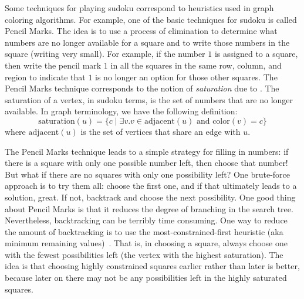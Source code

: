 \documentclass[7x10]{TimesAPriori_MIT}%
\numberwithin{theorem}{chapter}
\numberwithin{definition}{chapter}
\numberwithin{equation}{chapter}
\begin{document}
Some techniques for playing sudoku correspond to heuristics used in
graph coloring algorithms.  For example, one of the basic techniques
for sudoku is called Pencil Marks. The idea is to use a process of
elimination to determine what numbers are no longer available for a
square and to write those numbers in the square (writing very
small). For example, if the number $1$ is assigned to a square, then
write the pencil mark $1$ in all the squares in the same row, column,
and region to indicate that $1$ is no longer an option for those other
squares.
%
The Pencil Marks technique corresponds to the notion of
\emph{saturation} due to \citet{Brelaz:1979eu}.  The
saturation of a vertex, in sudoku terms, is the set of numbers that
are no longer available. In graph terminology, we have the following
definition:
\begin{equation*}
  \mathrm{saturation}(u) = \{ c \;|\; \exists v. v \in \mathrm{adjacent}(u)
     \text{ and } \mathrm{color}(v) = c \}
\end{equation*}
where $\mathrm{adjacent}(u)$ is the set of vertices that share an
edge with $u$.

The Pencil Marks technique leads to a simple strategy for filling in
numbers: if there is a square with only one possible number left, then
choose that number! But what if there are no squares with only one
possibility left? One brute-force approach is to try them all: choose
the first one, and if that ultimately leads to a solution, great.  If
not, backtrack and choose the next possibility.  One good thing about
Pencil Marks is that it reduces the degree of branching in the search
tree. Nevertheless, backtracking can be terribly time consuming. One
way to reduce the amount of backtracking is to use the
most-constrained-first heuristic (aka minimum remaining
values)~\citep{Russell2003}.  That is, in choosing a square, always
choose one with the fewest possibilities left (the vertex with the
highest saturation).  The idea is that choosing highly constrained
squares earlier rather than later is better, because later on there may
not be any possibilities left in the highly saturated squares.
\end{document}
